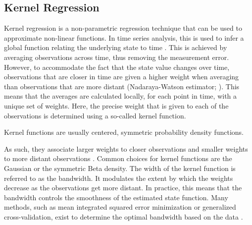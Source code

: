 
\subsection{Kernel Regression}

Kernel regression is a non-parametric regression technique that can be used to
approximate non-linear functions. In time series analysis, this is used to
infer a global
function relating the underlying state to time
\parencite{tsay_nonlinear_2019}. This is achieved by
averaging observations across time, thus removing the measurement error.
However, to accommodate the fact that the state value changes over time,
observations that are closer in time are given a higher weight when averaging
than observations that are more distant (Nadaraya-Watson estimator;
\cite{nadaraya_estimating_1964, watson_smooth_1964, bierens_topics_1994}).
This means that the averages are calculated locally, for each point in time,
with a
unique set of weights. Here, the precise weight that is given to each of the
observations is determined
using a so-called kernel function.

Kernel functions are usually centered, symmetric probability density functions.

As such, they associate larger weights to closer observations and smaller
weights to more distant observations
\parencite{nadaraya_estimating_1964}. Common choices for kernel functions are
the
Gaussian or the symmetric Beta density. The width of the kernel function is
referred to as the bandwidth. It modulates the extent by which the
weights decrease as the observations get more distant. In practice, this
means that the bandwidth controls the smoothness of the estimated state
function. Many methods,
such as mean integrated squared error minimization or generalized
cross-validation, exist to determine the optimal
bandwidth based on the data \parencite{kohler_review_2014,
    debruyne_model_2008}.

